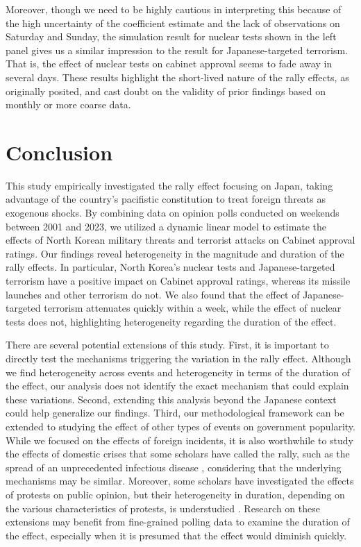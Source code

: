 \documentclass[letterpaper,12pt]{scrartcl}
\begin{document}
Moreover, though we need to be highly cautious in interpreting this because of the high uncertainty of the coefficient estimate and the lack of observations on Saturday and Sunday, the simulation result for nuclear tests shown in the left panel gives us a similar impression to the result for Japanese-targeted terrorism. That is, the effect of nuclear tests on cabinet approval seems to fade away in several days. These results highlight the short-lived nature of the rally effects, as \citet{Mueller1970APSR} originally posited, and cast doubt on the validity of prior findings based on monthly or more coarse data.

\section*{Conclusion\centering}

This study empirically investigated the rally effect focusing on Japan, taking advantage of the country's pacifistic constitution to treat foreign threats as exogenous shocks. By combining data on opinion polls conducted on weekends between 2001 and 2023, we utilized a dynamic linear model to estimate the effects of North Korean military threats and terrorist attacks on Cabinet approval ratings. Our findings reveal heterogeneity in the magnitude and duration of the rally effects. In particular, North Korea's nuclear tests and Japanese-targeted terrorism have a positive impact on Cabinet approval ratings, whereas its missile launches and other terrorism do not. We also found that the effect of Japanese-targeted terrorism attenuates quickly within a week, while the effect of nuclear tests does not, highlighting heterogeneity regarding the duration of the effect.

There are several potential extensions of this study. First, it is important to directly test the mechanisms triggering the variation in the rally effect. Although we find heterogeneity across events and heterogeneity in terms of the duration of the effect, our analysis does not identify the exact mechanism that could explain these variations. Second, extending this analysis beyond the Japanese context could help generalize our findings. Third, our methodological framework can be extended to studying the effect of other types of events on government popularity. While we focused on the effects of foreign incidents, it is also worthwhile to study the effects of domestic crises that some scholars have called the rally, such as the spread of an unprecedented infectious disease \citep[e.g.,][]{Kritzinger2021WestEurPolit,Yam2020PNAS}, considering that the underlying mechanisms may be similar. Moreover, some scholars have investigated the effects of protests on public opinion, but their heterogeneity in duration, depending on the various characteristics of protests, is understudied \citep{wallace2014,jimenez-sanchez2022}. Research on these extensions may benefit from fine-grained polling data to examine the duration of the effect, especially when it is presumed that the effect would diminish quickly.

\clearpage


\end{document}
